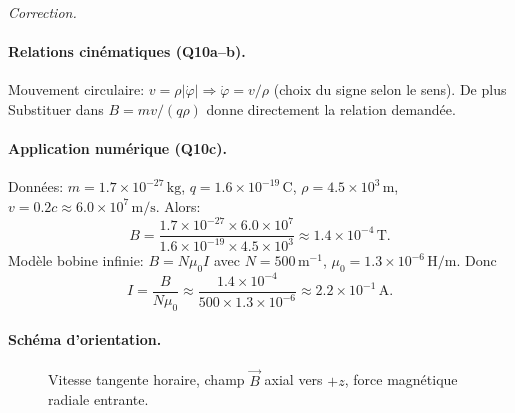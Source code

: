 \documentclass[11pt,a4paper]{article}
\newenvironment{correction}{
    \par\begingroup
    \color{blue!60!black}
    \smallskip\noindent\textit{Correction.}\quad
}{\par\medskip\endgroup}
\begin{document}
\begin{correction}
\paragraph{Relations cinématiques (Q10a--b).} Mouvement circulaire: $v=\rho|\dot\varphi| \Rightarrow \dot\varphi = v/\rho$ (choix du signe selon le sens). De plus Substituer dans $B = m v/(q\rho)$ donne directement la relation demandée.

\paragraph{Application numérique (Q10c).} Données: $m=1.7\times10^{-27}\,\text{kg}$, $q=1.6\times10^{-19}\,\text{C}$, $\rho=4.5\times10^{3}\,\text{m}$, $v = 0.2c \approx 6.0\times10^{7}\,\text{m/s}$. Alors:
\[
B = \frac{1.7\times10^{-27}\times6.0\times10^{7}}{1.6\times10^{-19}\times4.5\times10^{3}} \approx 1.4\times10^{-4}\,\text{T}.
\]
Modèle bobine infinie: $B=N\mu_0 I$ avec $N=500\,\text{m}^{-1}$, $\mu_0=1.3\times10^{-6}\,\text{H/m}$. Donc
\[
I = \frac{B}{N\mu_0} \approx \frac{1.4\times10^{-4}}{500\times1.3\times10^{-6}} \approx 2.2\times10^{-1}\,\text{A}.
\]
\paragraph{Schéma d'orientation.}
\begin{figure}[h]\centering
{}
\caption{Vitesse tangente horaire, champ $\vec B$ axial vers $+z$, force magnétique radiale entrante.}
\label{fig:magnetique}
\end{figure}
\end{correction}
\end{document}
